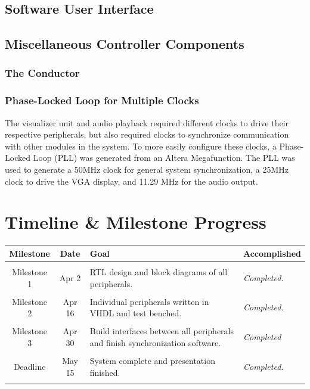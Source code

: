 \documentclass{article}
\begin{document}
\subsection{Software User Interface}

\subsection{Miscellaneous Controller Components}
\subsubsection{The Conductor}
\subsubsection{Phase-Locked Loop for Multiple Clocks}

The visualizer unit and audio playback required different clocks to drive their 
respective peripherals, but also required clocks to synchronize communication 
with other modules in the system. To more easily configure these clocks, 
a Phase-Locked Loop (PLL) was generated from an Altera Megafunction. The PLL 
was used to generate a 50MHz clock for general system synchronization, a 25MHz 
clock to drive the VGA display, and 11.29 MHz for the audio output. 

\section{Timeline \& Milestone Progress}
\begin{tabular}{cc|p{7cm}p{3cm}}
\textbf{Milestone} & \textbf{Date} & \textbf{Goal} & \textbf{Accomplished}\\ \hline
&&&\\
Milestone 1 & Apr 2 & RTL design and block diagrams of all peripherals.&
	\textit{Completed.}\\
&&&\\
Milestone 2 & Apr 16 & Individual peripherals written in VHDL and test benched.&
	\textit{Completed.}\\
&&&\\
Milestone 3 & Apr 30 & Build interfaces between all peripherals and finish synchronization software. &
	\textit{Completed}\\
&&&\\
Deadline&May 15&System complete and presentation finished.&\textit{Completed.}\\
&&&\\
\end{tabular}
\end{document}
